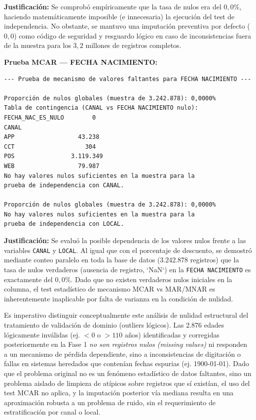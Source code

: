 \documentclass[12pt,letterpaper]{article}
\begin{document}
\textbf{Justificación:} Se comprobó empíricamente que la tasa de nulos era del $0,0\%$, haciendo matemáticamente imposible (e innecesaria) la ejecución del test de independencia. No obstante, se mantuvo una imputación preventiva por defecto ($0,0$) como código de seguridad y resguardo lógico en caso de inconsistencias fuera de la muestra para los $3,2$ millones de registros completos.

\vspace{0.4cm}
\noindent\textbf{Prueba MCAR — FECHA NACIMIENTO:}
\begin{verbatim}
--- Prueba de mecanismo de valores faltantes para FECHA NACIMIENTO ---

Proporción de nulos globales (muestra de 3.242.878): 0,0000%
Tabla de contingencia (CANAL vs FECHA NACIMIENTO nulo):
FECHA_NAC_ES_NULO        0
CANAL                     
APP                  43.238
CCT                    304
POS                3.119.349
WEB                  79.987
No hay valores nulos suficientes en la muestra para la
prueba de independencia con CANAL.

Proporción de nulos globales (muestra de 3.242.878): 0,0000%
No hay valores nulos suficientes en la muestra para la
prueba de independencia con LOCAL.
\end{verbatim}
\vspace{0.4cm}

\textbf{Justificación:} Se evaluó la posible dependencia de los valores nulos frente a las variables \texttt{CANAL} y \texttt{LOCAL}. Al igual que con el porcentaje de descuento, se demostró mediante conteo paralelo en toda la base de datos (3.242.878 registros) que la tasa de nulos verdaderos (ausencia de registro, `NaN`) en la \texttt{FECHA NACIMIENTO} es exactamente del $0,0\%$. Dado que no existen verdaderos nulos iniciales en la columna, el test estadístico de mecanismo MCAR vs MAR/MNAR es inherentemente inaplicable por falta de varianza en la condición de nulidad. 

Es imperativo distinguir conceptualmente este análisis de nulidad estructural del tratamiento de validación de dominio (outliers lógicos). Las 2.876 edades lógicamente inválidas (ej. $< 0$ o $> 110$ años) identificadas y corregidas posteriormente en la Fase 1 \textit{no son registros nulos (missing values)} ni responden a un mecanismo de pérdida dependiente, sino a inconsistencias de digitación o fallas en sistemas heredados que contenían fechas espurias (ej. 1900-01-01). Dado que el problema original no es un fenómeno estadístico de datos faltantes, sino un problema aislado de limpieza de atípicos sobre registros que sí existían, el uso del test MCAR no aplica, y la imputación posterior vía mediana resulta en una aproximación robusta a un problema de ruido, sin el requerimiento de estratificación por canal o local.
\end{document}
